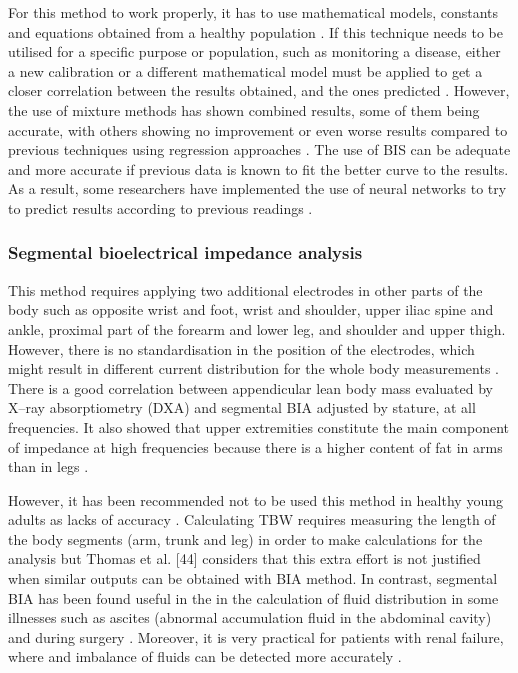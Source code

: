 For this method to work properly, it has to use mathematical models, constants and equations obtained from a healthy population \cite{patel1994estimation}. If this technique needs to be utilised for a specific purpose or population, such as monitoring a disease, either a new calibration or a different mathematical model must be applied to get a closer correlation between the results obtained, and the ones predicted \cite{schoeller2000bioelectrical, de1997predicting}. However, the use of mixture methods has shown combined results, some of them being accurate, with others showing no improvement or even worse results compared to previous techniques using regression approaches \cite{kyle2004bioelectrical}. The use of BIS can be adequate and more accurate if previous data is known to fit the better curve to the results. As a result, some researchers have implemented the use of neural networks to try to predict results according to previous readings \cite{songer2001tissue,kun2003algorithm}. 

\subsubsection{Segmental bioelectrical impedance analysis}
This method requires applying two additional electrodes in other parts of the body such as opposite wrist and foot, wrist and shoulder, upper iliac spine and ankle, proximal part of the forearm and lower leg, and shoulder and upper thigh. However, there is no standardisation in the position of the electrodes, which might result in different current distribution for the whole body measurements \cite{kyle2004bioelectrical, woodrow1996segmental}. There is a good correlation between appendicular lean body mass evaluated by X–ray absorptiometry (DXA) and segmental BIA adjusted by stature, at all frequencies. It also showed that upper extremities constitute the main component of impedance at high frequencies because there is a higher content of fat in arms than in legs \cite{delorenzo2003segmental}. 


However, it has been recommended not to be used this method in healthy young adults as lacks of accuracy \cite{laforgia2008body,leahy2012comparison}. Calculating TBW requires measuring the length of the body segments (arm, trunk and leg) in order to make calculations for the analysis but Thomas et al. [44] considers that this extra effort is not justified when similar outputs can be obtained with BIA method. In contrast, segmental BIA has been found useful in the in the calculation of fluid distribution in some illnesses such as ascites (abnormal accumulation fluid in the abdominal cavity) and during surgery \cite{kyle2004bioelectrical}. Moreover, it is very practical for patients with renal failure, where and imbalance of fluids can be detected more accurately \cite{woodrow1996segmental,thomas2003comparison}. 

